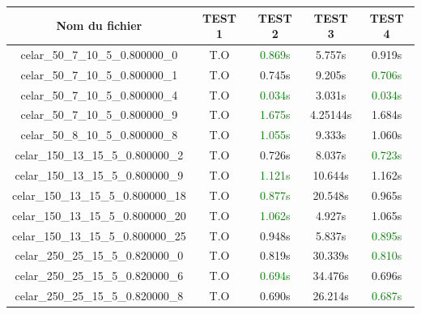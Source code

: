 \documentclass[a4paper, 10pt]{article}
\begin{document}
       \begin{minipage}[t]{0.6\linewidth}
         \footnotesize
         \begin{tabular}{| c | c | c| c| c |}
           \hline
           \textbf{Nom du fichier} & \textbf{TEST 1} & \textbf{TEST 2} & \textbf{TEST 3} & \textbf{TEST 4} \\
           \hline
           celar\_50\_7\_10\_5\_0.800000\_0 & \textcolor[gray]{0.6}{T.O} & \textcolor{green}{0.869s} & 5.757s & 0.919s  \\
           \hline
           celar\_50\_7\_10\_5\_0.800000\_1 & \textcolor[gray]{0.6}{T.O}  & 0.745s & 9.205s & \textcolor{green}{0.706s} \\
           \hline
           celar\_50\_7\_10\_5\_0.800000\_4 & \textcolor[gray]{0.6}{T.O}&\textcolor{green}{0.034s} & 3.031s & \textcolor{green}{0.034s} \\
           \hline
           celar\_50\_7\_10\_5\_0.800000\_9 &  \textcolor[gray]{0.6}{T.O} &\textcolor{green}{ 1.675s} & 4.25144s & 1.684s \\
           \hline
           celar\_50\_8\_10\_5\_0.800000\_8 & \textcolor[gray]{0.6}{T.O} & \textcolor{green}{1.055s} & 9.333s & 1.060s  \\
           \hline
           celar\_150\_13\_15\_5\_0.800000\_2 & \textcolor[gray]{0.6}{T.O} & 0.726s & 8.037s & \textcolor{green}{0.723s} \\
           \hline
           celar\_150\_13\_15\_5\_0.800000\_9 & \textcolor[gray]{0.6}{T.O} & \textcolor{green}{1.121s} & 10.644s & 1.162s  \\
           \hline
           celar\_150\_13\_15\_5\_0.800000\_18 & \textcolor[gray]{0.6}{T.O} &\textcolor{green}{ 0.877s }&  20.548s & 0.965s \\
           \hline
           celar\_150\_13\_15\_5\_0.800000\_20 & \textcolor[gray]{0.6}{T.O} & \textcolor{green}{1.062s} & 4.927s & 1.065s \\
           \hline
           celar\_150\_13\_15\_5\_0.800000\_25 &  \textcolor[gray]{0.6}{T.O}& 0.948s & 5.837s & \textcolor{green}{0.895s } \\
           \hline
           celar\_250\_25\_15\_5\_0.820000\_0 &  \textcolor[gray]{0.6}{T.O} & 0.819s & 30.339s & \textcolor{green}{0.810s} \\
           \hline
           celar\_250\_25\_15\_5\_0.820000\_6 & \textcolor[gray]{0.6}{T.O} &\textcolor{green}{ 0.694s} & 34.476s & 0.696s  \\
           \hline
           celar\_250\_25\_15\_5\_0.820000\_8 & \textcolor[gray]{0.6}{T.O} & 0.690s & 26.214s & \textcolor{green}{0.687s} \\

\end{tabular}
\end{minipage}
\end{document}
